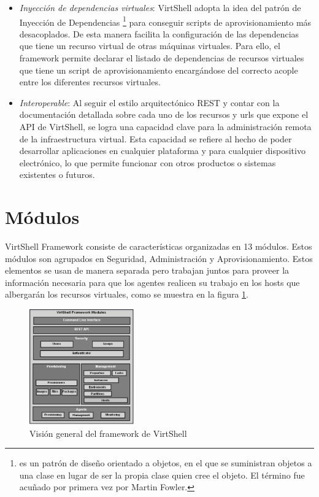 \documentclass[conference, spanish]{IEEEtran}
\begin{document}
\begin{itemize}
\item \emph{Inyección de dependencias virtuales}: VirtShell adopta la idea del patrón de Inyección de Dependencias \footnote{es un patrón de diseño orientado a objetos, en el que se suministran objetos a una clase en lugar de ser la propia clase quien cree el objeto. El término fue acuñado por primera vez por Martin Fowler.} \cite{fowler04} para conseguir scripts de aprovisionamiento más desacoplados. De esta manera facilita la configuración de las dependencias que tiene un recurso virtual de otras máquinas virtuales. Para ello, el framework permite declarar el listado de dependencias de recursos virtuales que tiene un script de aprovisionamiento encargándose del correcto acople entre los diferentes recursos virtuales.
\item \emph{Interoperable}: Al seguir el estilo arquitectónico REST y contar con la documentación detallada sobre cada uno de los recursos y urls que expone el API de VirtShell, se logra una capacidad clave para la administración remota de la infraestructura virtual. Esta capacidad se refiere al hecho de poder desarrollar aplicaciones en cualquier plataforma y para cualquier dispositivo electrónico, lo que permite funcionar con otros productos o sistemas existentes o futuros.

\end{itemize}

\section{Módulos}
VirtShell Framework consiste de características organizadas en 13 módulos. Estos módulos son agrupados en Seguridad, Administración y Aprovisionamiento. Estos elementos se usan de manera separada pero trabajan juntos para proveer la información necesaria para que los agentes realicen su trabajo en los hosts que albergarán los recursos virtuales, como se muestra en la figura \ref{fig:framework}. \\

\begin{figure}[h]
  \centering
  \includegraphics[width = 0.4\textwidth]{../architecture/v1/diagrams/framework}
  \caption{Visión general del framework de VirtShell}
  \label{fig:framework}
\end{figure}
\end{document}
